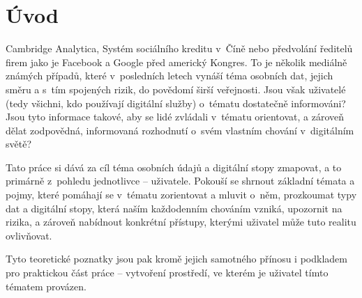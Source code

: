 \chapter*{Úvod}
\pagestyle{plain}

Cambridge Analytica, Systém sociálního kreditu v~Číně nebo předvolání ředitelů firem jako je Facebook a Google před americký Kongres. To je několik mediálně známých případů, které v~posledních letech vynáší téma osobních dat, jejich směru a s~tím spojených rizik, do povědomí širší veřejnosti.
Jsou však uživatelé (tedy všichni, kdo používají digitální služby) o~tématu dostatečně informováni? Jsou tyto informace takové, aby se lidé zvládali v~tématu orientovat, a zároveň dělat zodpovědná, informovaná rozhodnutí o~svém vlastním chování v~digitálním světě?

Tato práce si dává za cíl téma osobních údajů a digitální stopy zmapovat, a to primárně z~pohledu jednotlivce -- uživatele. Pokouší se shrnout základní témata a pojmy, které pomáhají se v~tématu zorientovat a mluvit o~něm, prozkoumat typy dat a digitální stopy, která naším každodenním chováním vzniká, upozornit na rizika, a zároveň nabídnout konkrétní přístupy, kterými uživatel může tuto realitu ovlivňovat.

Tyto teoretické poznatky jsou pak kromě jejich samotného přínosu i podkladem pro praktickou část práce -- vytvoření prostředí, ve kterém je uživatel tímto tématem provázen.
